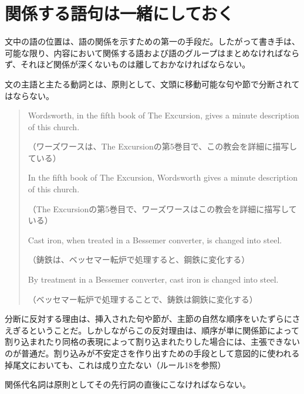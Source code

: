 \section{関係する語句は一緒にしておく}
文中の語の位置は、語の関係を示すための第一の手段だ。したがって書き手は、可能な限り、内容において関係する語および語のグループはまとめなければならず、それほど関係が深くないものは離しておかなければならない。
\par
文の主語と主たる動詞とは、原則として、文頭に移動可能な句や節で分断されてはならない。
\begin{quote}
    Wordsworth, in the fifth book of The Excursion, gives a minute
description of this church.

（ワーズワースは、The
Excursionの第5巻目で、この教会を詳細に描写している）

In the fifth book of The Excursion, Wordsworth gives a minute
description of this church.

（The Excursionの第5巻目で、ワーズワースはこの教会を詳細に描写している）

Cast iron, when treated in a Bessemer converter, is changed into
steel.

（鋳鉄は、ベッセマー転炉で処理すると、鋼鉄に変化する）

By treatment in a Bessemer converter, cast iron is changed into
steel.

（ベッセマー転炉で処理することで、鋳鉄は鋼鉄に変化する）
\end{quote}
分断に反対する理由は、挿入された句や節が、主節の自然な順序をいたずらにさえぎるということだ。しかしながらこの反対理由は、順序が単に関係節によって割り込まれたり同格の表現によって割り込まれたりした場合には、主張できないのが普通だ。割り込みが不安定さを作り出すための手段として意図的に使われる掉尾文においても、これは成り立たない（ルール18を参照）
\par 関係代名詞は原則としてその先行詞の直後にこなければならない。
